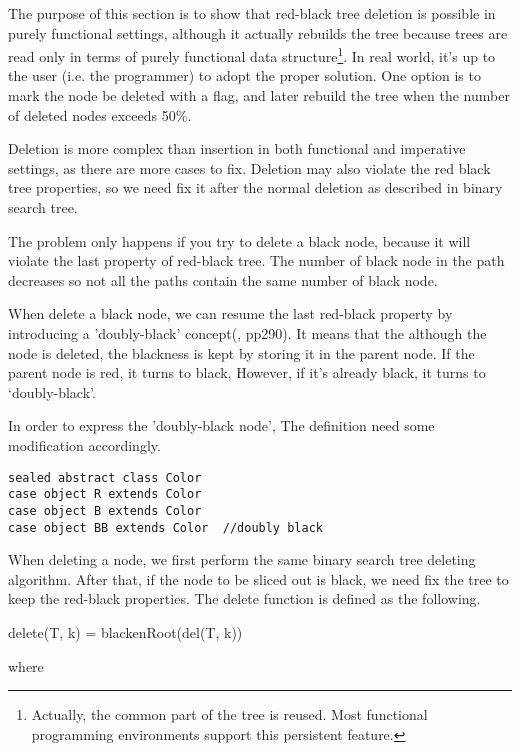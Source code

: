 \documentclass{article}
\begin{document}
The purpose of this section is to show that red-black
tree deletion is possible in purely functional settings,
although it actually rebuilds the tree because trees are
read only in terms of purely functional data structure\footnote{Actually, the common part of the tree is reused. Most functional programming environments support this persistent feature.}.
In real world, it's up to the user (i.e. the
programmer) to adopt the proper solution. One option is to mark
the node be deleted with a flag, and later rebuild the tree
when the number of deleted nodes exceeds 50\%.

Deletion is more complex than insertion in both functional and
imperative settings, as there are more cases to fix.
Deletion may also violate the red black tree properties,
so we need fix it after the normal deletion as described
in binary search tree.

The problem only happens if you try to
delete a black node, because it will violate the last property
of red-black tree. The number of black
node in the path decreases so not all the paths contain the
same number of black node.

When delete a black node, we can resume the last red-black property
by introducing a 'doubly-black' concept(\cite{CLRS}, pp290). It means
that the although the node is deleted, the blackness is kept
by storing it in the parent node. If the parent node is red,
it turns to black, However, if it's already black, it
turns to `doubly-black'.

In order to express the 'doubly-black node', The definition
need some modification accordingly.

\lstset{language=Scala}
\begin{lstlisting}
sealed abstract class Color
case object R extends Color
case object B extends Color
case object BB extends Color  //doubly black
\end{lstlisting}

When deleting a node, we first perform the same binary search tree deleting
algorithm. After that, if the node to be sliced out is black, we
need fix the tree to keep the red-black properties. The
delete function is defined as the following.

\be
delete(T, k) = blackenRoot(del(T, k))
\ee

where
\end{document}
